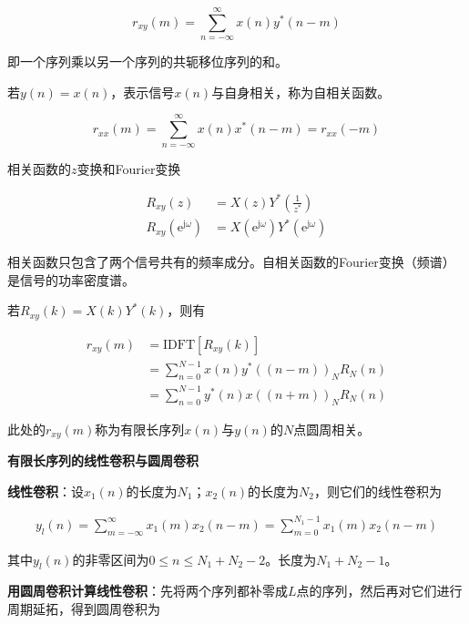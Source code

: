 \documentclass[cn, hazy, blue, normal, 14pt]{elegantnote}
\begin{document}
\begin{equation}
    r_{xy}(m)=\sum_{n=-\infty}^{\infty}{x(n)y^*(n-m)}
\end{equation}

即一个序列乘以另一个序列的共轭移位序列的和。

若$y(n)=x(n)$，表示信号$x(n)$与自身相关，称为自相关函数。

\begin{equation}
    r_{xx}(m)=\sum_{n=-\infty}^{\infty}{x(n)x^*(n-m)}=r_{xx}(-m)
\end{equation}

相关函数的$z$变换和Fourier变换

\begin{equation}
\begin{aligned}
    R_{xy}(z)&=X(z)Y^*\left(\frac{1}{z^*}\right) \\
    R_{xy}(\text{e}^{\text{j}\omega})&=X(\text{e}^{\text{j}\omega})Y^*(\text{e}^{\text{j}\omega})
\end{aligned}
\end{equation}

相关函数只包含了两个信号共有的频率成分。自相关函数的Fourier变换（频谱）是信号的功率密度谱。

若$R_{xy}(k)=X(k)Y^*(k)$，则有

\begin{equation}
\begin{aligned}
    r_{xy}(m)&=\text{IDFT}[R_{xy}(k)] \\
    &=\sum_{n=0}^{N-1}{x(n)y^*((n-m))_N R_N(n)} \\
    &=\sum_{n=0}^{N-1}{y^*(n)x((n+m))_N R_N(n)} 
\end{aligned}
\end{equation}

此处的$r_{xy}(m)$称为有限长序列$x(n)$与$y(n)$的$N$点圆周相关。

\textbf{有限长序列的线性卷积与圆周卷积}

\textbf{线性卷积}：设$x_1(n)$的长度为$N_1$；$x_2(n)$的长度为$N_2$，则它们的线性卷积为

\begin{equation}
\begin{aligned}
    y_l(n)=\sum_{m=-\infty}^{\infty}{x_1(m)x_2(n-m)}=\sum_{m=0}^{N_1-1}{x_1(m)x_2(n-m)}
\end{aligned}
\end{equation}

其中$y_l(n)$的非零区间为$0\leq n\leq N_1+N_2-2$。长度为$N_1+N_2-1$。

\textbf{用圆周卷积计算线性卷积}：先将两个序列都补零成$L$点的序列，然后再对它们进行周期延拓，得到圆周卷积为
\end{document}

